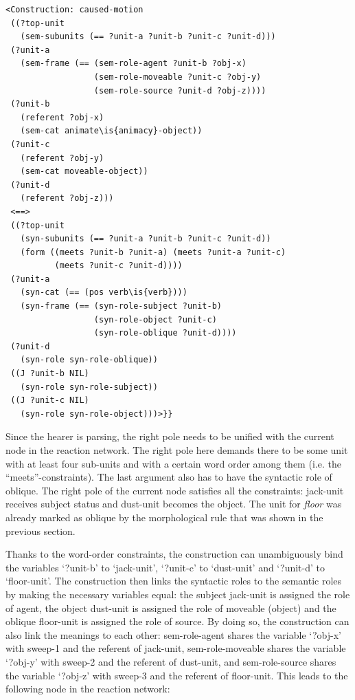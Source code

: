 \ea
\begin{lstlisting}
<Construction: caused-motion
 ((?top-unit
   (sem-subunits (== ?unit-a ?unit-b ?unit-c ?unit-d)))
 (?unit-a
   (sem-frame (== (sem-role-agent ?unit-b ?obj-x)
                  (sem-role-moveable ?unit-c ?obj-y)
                  (sem-role-source ?unit-d ?obj-z))))
 (?unit-b
   (referent ?obj-x)
   (sem-cat animate\is{animacy}-object))
 (?unit-c
   (referent ?obj-y)
   (sem-cat moveable-object))
 (?unit-d
   (referent ?obj-z)))
 <==>
 ((?top-unit
   (syn-subunits (== ?unit-a ?unit-b ?unit-c ?unit-d))
   (form ((meets ?unit-b ?unit-a) (meets ?unit-a ?unit-c)
          (meets ?unit-c ?unit-d))))
 (?unit-a
   (syn-cat (== (pos verb\is{verb})))
   (syn-frame (== (syn-role-subject ?unit-b)
                  (syn-role-object ?unit-c)
                  (syn-role-oblique ?unit-d))))
 (?unit-d
   (syn-role syn-role-oblique))
 ((J ?unit-b NIL)
   (syn-role syn-role-subject))
 ((J ?unit-c NIL) 
   (syn-role syn-role-object)))>}}

\end{lstlisting}
\z

Since the hearer is parsing, the right pole needs to be unified with the current node in the reaction network. The right pole here demands there to be some unit with at least four sub-units and with a certain word order among them (i.e. the ``meets''-constraints). The last argument also has to have the syntactic role of oblique. The right pole of the current node satisfies all the constraints: jack-unit receives subject status and dust-unit becomes the object. The unit for {\em floor} was already marked as oblique by the morphological rule that was shown in the previous section.

Thanks to the word-order constraints, the construction can unambiguously bind the variables `?unit-b' to `jack-unit', `?unit-c' to `dust-unit' and `?unit-d' to `floor-unit'. The construction then links the syntactic roles to the semantic roles by making the necessary variables equal: the subject jack-unit is assigned the role of agent, the object dust-unit is assigned the role of moveable (object) and the oblique floor-unit is assigned the role of source. By doing so, the construction can also link the meanings to each other: sem-role-agent shares the variable `?obj-x' with sweep-1 and the referent of jack-unit, sem-role-moveable shares the variable `?obj-y' with sweep-2 and the referent of dust-unit, and sem-role-source shares the variable `?obj-z' with sweep-3 and the referent of floor-unit. This leads to the following node in the reaction network:


